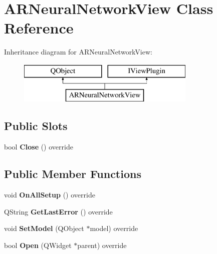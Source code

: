 \hypertarget{class_a_r_neural_network_view}{}\section{A\+R\+Neural\+Network\+View Class Reference}
\label{class_a_r_neural_network_view}
Inheritance diagram for A\+R\+Neural\+Network\+View\+:\begin{figure}[H]
\begin{center}
\leavevmode
\includegraphics[height=2.000000cm]{class_a_r_neural_network_view}
\end{center}
\end{figure}
\subsection*{Public Slots}
\begin{DoxyCompactItemize}
\item 
\mbox{\label{class_a_r_neural_network_view_ae72f15b3cabb9671d3193b1a0a389b5d}} 
bool {\bfseries Close} () override
\end{DoxyCompactItemize}
\subsection*{Public Member Functions}
\begin{DoxyCompactItemize}
\item 
\mbox{\label{class_a_r_neural_network_view_adfd8b5d501011015ce400df5c43a52da}} 
void {\bfseries On\+All\+Setup} () override
\item 
\mbox{\label{class_a_r_neural_network_view_ad6bd977f54c1f9683bdcec3599c8b2b1}} 
Q\+String {\bfseries Get\+Last\+Error} () override
\item 
\mbox{\label{class_a_r_neural_network_view_a1db4e02fbfb62f194d2ffe76f9fb5bc7}} 
void {\bfseries Set\+Model} (Q\+Object $\ast$model) override
\item 
\mbox{\label{class_a_r_neural_network_view_ad6df97a34949027264a221952677e92d}} 
bool {\bfseries Open} (Q\+Widget $\ast$parent) override
\end{DoxyCompactItemize}


